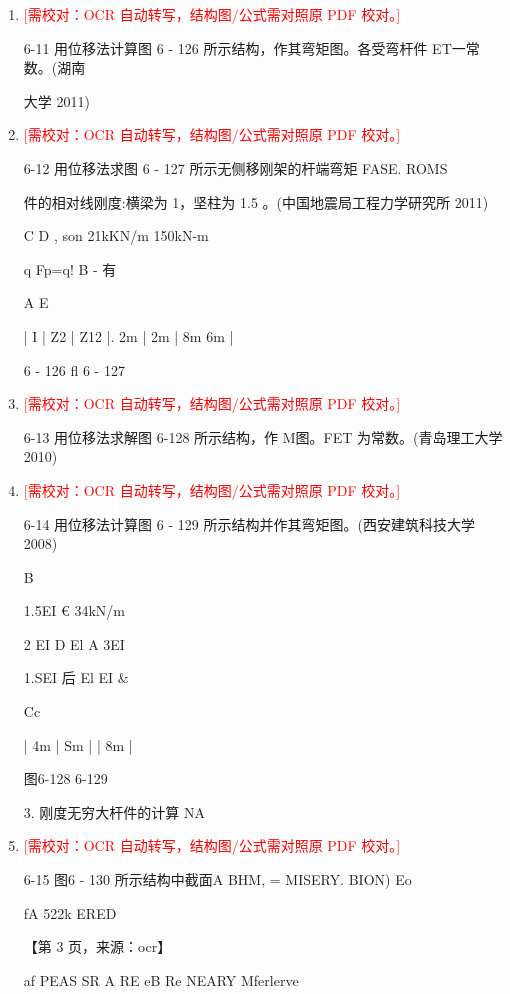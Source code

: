 \documentclass[UTF8,12pt,a4paper,openany]{ctexbook}
\newcommand{\TODO}[1]{\textcolor{red}{[需校对：#1]}}
\begin{document}
\begin{enumerate}[label=\textbf{\arabic*.},leftmargin=2em]
\item \TODO{OCR 自动转写，结构图/公式需对照原 PDF 校对。}\par 6-11 用位移法计算图 6 - 126 所示结构，作其弯矩图。各受弯杆件 ET一常数。(湖南\par 大学 2011)
\item \TODO{OCR 自动转写，结构图/公式需对照原 PDF 校对。}\par 6-12 用位移法求图 6 - 127 所示无侧移刚架的杆端弯矩 FASE. ROMS\par 件的相对线刚度:横梁为 1，坚柱为 1.5 。(中国地震局工程力学研究所 2011)\par C                  D   ,                                     son         21kKN/m                150kN-m\par q             Fp=q!       B   -                                                            有\par A                 E\par |    I    |  Z2  |  Z12    |. 2m | 2m |    8m        6m   |\par 6 - 126                                                         fl 6 - 127
\item \TODO{OCR 自动转写，结构图/公式需对照原 PDF 校对。}\par 6-13 用位移法求解图 6-128 所示结构，作 M图。FET 为常数。(青岛理工大学 2010)
\item \TODO{OCR 自动转写，结构图/公式需对照原 PDF 校对。}\par 6-14 用位移法计算图 6 - 129 所示结构并作其弯矩图。(西安建筑科技大学 2008)\par B\par 1.5EI          €                        34kN/m\par 2     EI         D    El      A                                     3EI\par 1.SEI          后              El                      EI       \&\par Cc\par |     4m      |       Sm       |                       |             8m             |\par 图6-128 6-129\par 3. 刚度无穷大杆件的计算                                                                     NA
\item \TODO{OCR 自动转写，结构图/公式需对照原 PDF 校对。}\par 6-15 图6 - 130 所示结构中截面A BHM, =               MISERY.   BION) Eo\par fA 522k ERED\par \par 【第 3 页，来源：ocr】\par af PEAS SR A RE eB Re NEARY Mferlerve

\end{enumerate}
\end{document}
